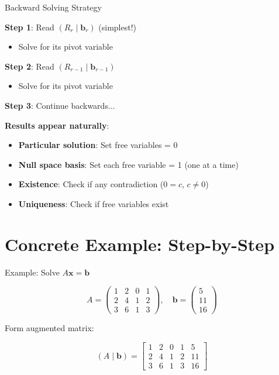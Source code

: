 \documentclass[10pt]{beamer}
\theoremstyle{definition}
\newcommand{\x}[1]{\alert{\textbf{#1}}}
\begin{document}
\begin{frame}{Backward Solving Strategy}

\textbf{Step 1}: Read $(R_r \mid \mathbf{b}_r)$ (simplest!)
\begin{itemize}
\item Solve for its pivot variable
\end{itemize}

\textbf{Step 2}: Read $(R_{r-1} \mid \mathbf{b}_{r-1})$
\begin{itemize}
\item Solve for its pivot variable
\end{itemize}

\textbf{Step 3}: Continue backwards$\ldots$

\vspace{1em}

\x{Results appear naturally}:
\begin{itemize}
\item \textbf{Particular solution}: Set free variables = 0
\item \textbf{Null space basis}: Set each free variable = 1 (one at a time)
\item \textbf{Existence}: Check if any contradiction ($0 = c$, $c \neq 0$)
\item \textbf{Uniqueness}: Check if free variables exist
\end{itemize}

\end{frame}

\section{Concrete Example: Step-by-Step}

\begin{frame}{Example: Solve $A\mathbf{x} = \mathbf{b}$}

$$A = \begin{pmatrix}
1 & 2 & 0 & 1 \\
2 & 4 & 1 & 2 \\
3 & 6 & 1 & 3
\end{pmatrix}, \quad \mathbf{b} = \begin{pmatrix} 5 \\ 11 \\ 16 \end{pmatrix}$$

\vspace{0.5em}

Form augmented matrix:

$$(A \mid \mathbf{b}) = \left[\begin{array}{cccc|c}
1 & 2 & 0 & 1 & 5 \\
2 & 4 & 1 & 2 & 11 \\
3 & 6 & 1 & 3 & 16
\end{array}\right]$$

\end{frame}
\end{document}
